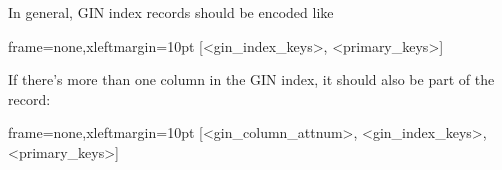 In general, GIN index records should be encoded like

\begin{textcode*}{frame=none,xleftmargin=10pt}
[<gin_index_keys>, <primary_keys>]
\end{textcode*}

If there's more than one column in the GIN index, it should also be part of the
record:

\begin{textcode*}{frame=none,xleftmargin=10pt}
[<gin_column_attnum>, <gin_index_keys>, <primary_keys>]
\end{textcode*}
